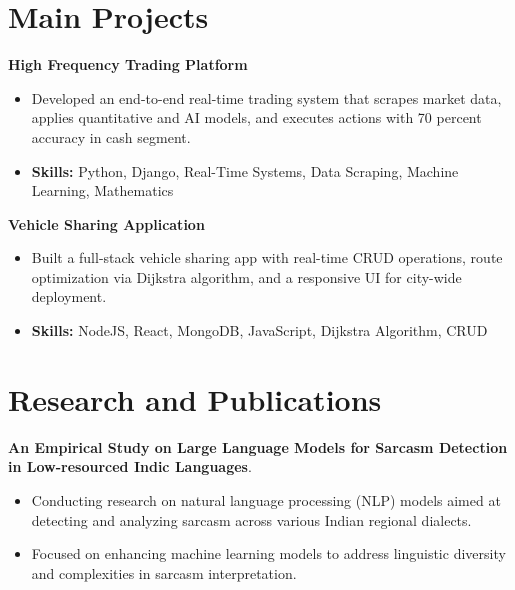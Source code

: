 \documentclass[a4paper,11pt]{article}
\begin{document}
\section{\textbf{Main Projects}}

\vspace{1mm}
  \textbf{High Frequency Trading Platform  }
\vspace{-1.5mm} %
\begin{itemize}
  \item Developed an end-to-end real-time trading system that scrapes market data, applies quantitative and AI models, and executes actions with 70 percent accuracy in cash segment.
\vspace{-3mm}
  \item \textbf{Skills:} Python, Django, Real-Time Systems, Data Scraping, Machine Learning, Mathematics
\end{itemize}


\vspace{1mm}
   \textbf{Vehicle Sharing Application }
\vspace{-1.5mm} %
\begin{itemize}
  \item Built a full-stack vehicle sharing app with real-time CRUD operations, route optimization via Dijkstra algorithm, and a responsive UI for city-wide deployment.
\vspace{-3mm}
  \item \textbf{Skills:} NodeJS, React, MongoDB, JavaScript, Dijkstra Algorithm, CRUD
\end{itemize}



\section{\textbf{Research and Publications} \hfill }
\vspace{1mm}
  \textbf{An Empirical Study on Large Language Models for Sarcasm Detection in Low-resourced Indic Languages}.
\vspace{-1mm} %
\begin{itemize}
  \item Conducting research on natural language processing (NLP) models aimed at detecting and analyzing sarcasm across various Indian regional dialects.
\vspace{-3mm}
  \item Focused on enhancing machine learning models to address linguistic diversity and complexities in sarcasm interpretation.
\end{itemize}
\end{document}
